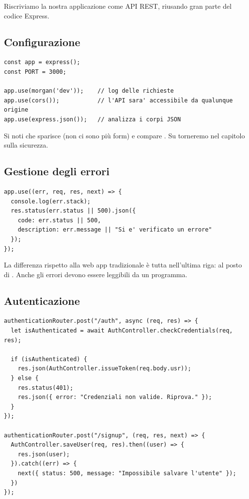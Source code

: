 Riscriviamo la nostra applicazione come API REST, riusando gran parte del codice
Express.

\subsection{Configurazione}

\begin{lstlisting}[style=js, name=index.js]
const app = express();
const PORT = 3000;

app.use(morgan('dev'));    // log delle richieste
app.use(cors());           // l'API sara' accessibile da qualunque origine
app.use(express.json());   // analizza i corpi JSON
\end{lstlisting}

Si noti che sparisce  (non ci sono più form) e compare
. Su  torneremo nel capitolo sulla sicurezza.

\subsection{Gestione degli errori}

\begin{lstlisting}[style=js, name=index.js]
app.use((err, req, res, next) => {
  console.log(err.stack);
  res.status(err.status || 500).json({
    code: err.status || 500,
    description: err.message || "Si e' verificato un errore"
  });
});
\end{lstlisting}

La differenza rispetto alla web app tradizionale è tutta nell'ultima riga:
 al posto di . Anche gli errori devono
essere leggibili da un programma.

\subsection{Autenticazione}

\begin{lstlisting}[style=js, name=routes/authenticationRouter.js]
authenticationRouter.post("/auth", async (req, res) => {
  let isAuthenticated = await AuthController.checkCredentials(req, res);

  if (isAuthenticated) {
    res.json(AuthController.issueToken(req.body.usr));
  } else {
    res.status(401);
    res.json({ error: "Credenziali non valide. Riprova." });
  }
});

authenticationRouter.post("/signup", (req, res, next) => {
  AuthController.saveUser(req, res).then((user) => {
    res.json(user);
  }).catch((err) => {
    next({ status: 500, message: "Impossibile salvare l'utente" });
  })
});
\end{lstlisting}

